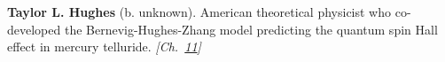 \textbf{Taylor L. Hughes} (b. unknown). American theoretical physicist who co-developed the Bernevig-Hughes-Zhang model predicting the quantum spin Hall effect in mercury telluride. \emph{[Ch.~\hyperref[ch:topologicalinsulators]{11}]}

